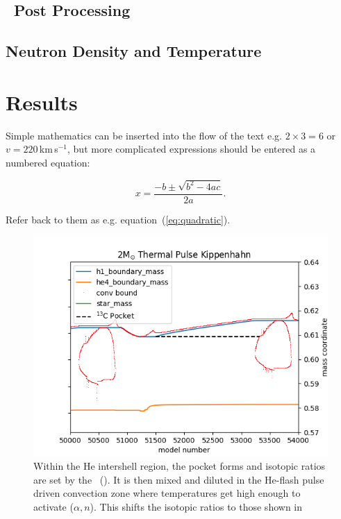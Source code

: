 \documentclass[fleqn,usenatbib]{mnras}
\begin{document}
\subsection{\mppnp~Post Processing}
\label{sec:mppnp}

\subsection{Neutron Density and Temperature}
\label{sec:neutron}

\section{Results}
Simple mathematics can be inserted into the flow of the text e.g. $2\times3=6$
or $v=220$\,km\,s$^{-1}$, but more complicated expressions should be entered
as a numbered equation:

\begin{equation}
    x=\frac{-b\pm\sqrt{b^2-4ac}}{2a}.
	\label{eq:quadratic}
\end{equation}

Refer back to them as e.g. equation~(\ref{eq:quadratic}).

\begin{figure}
  \includegraphics[width=\columnwidth]{figs/2M_Kippenhahn.png}
  \caption{Within the He intershell region, the \carbon[13] pocket forms and isotopic ratios are set by the \spr~(). It is then mixed and diluted in the He-flash pulse driven convection zone where temperatures get high enough to activate \neon[22]($\alpha,n$)\magnesium[25]. This shifts the isotopic ratios to those shown in } 
\end{figure}
\end{document}
